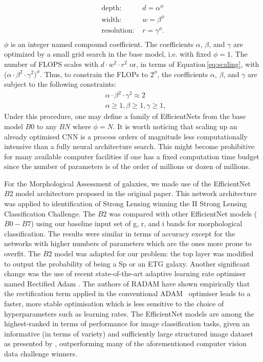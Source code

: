 \documentclass[fleqn,usenatbib]{mnras}
\begin{document}
\begin{equation} \label{eq:scaling} 
\begin{aligned}
\text{depth: } & d  = \alpha ^ \phi \\
\text{width: } & w = \beta ^ \phi \\
\text{resolution: } & r   =  \gamma ^ \phi.  \\
\end{aligned}
\end{equation}
$\phi$ is an integer named compound coefficient.
The coefficients $\alpha$, $\beta$, and $\gamma$ are optimized by a small grid search in the base model, i.e. with fixed $\phi=1$. The number of FLOPS scales with $d \cdot w^2 \cdot r^2$ or, in terms of Equation\,\ref{eq:scaling}, with ($\alpha \cdot \beta ^2 \cdot \gamma ^2)^ \phi$. Thus, to constrain the FLOPs to $2^\phi$, the coefficients $\alpha$, $\beta$, and $\gamma$ are subject to the following constraints:
\begin{equation} \label{eq:optobj} 
\begin{aligned}
& \alpha \cdot \beta ^2 \cdot \gamma ^ 2 \approx 2 \\
& \alpha \ge 1, \beta \ge 1, \gamma \ge 1, 
\end{aligned}
\end{equation}
Under this procedure, one may define a family of EfficientNets from the base model $B0$ to any $BN$ where $\phi=N$. 
It is worth noticing that scaling up an already optimised CNN is a process orders of magnitude less computationally intensive than a fully neural architecture search. This might become prohibitive for many available computer facilities if one has a fixed computation time budget since the number of parameters is of the order of millions or dozen of millions. 

For the Morphological Assessment of galaxies, we made use of the EfficientNet $B2$ model architecture proposed in the original \citet{efficientnet} paper. This network architecture was applied to identification of Strong Lensing \citep{challenge02} winning the II Strong Lensing Classification Challenge. The $B2$ was compared with other EfficientNet models ($B0-B7$) using our baseline input set of g, r, and i bands for morphological classification. The results were similar in terms of accuracy except for the networks with higher numbers of parameters which are the ones more prone to overfit. The $B2$ model was adapted for our problem: the top layer was modified to output the probability of being a Sp or an ETG galaxy. Another significant change was the use of recent state-of-the-art adaptive learning rate optimiser named Rectified Adam \citep[RADAM][]{liu2019variance}. The authors of RADAM have shown empirically that the rectification term applied in the conventional ADAM~\citep{kingma2014adam} optimiser leads to a faster, more stable optimisation which is less sensitive to the choice of hyperparameters such as learning rates. The EfficientNet models are among the highest-ranked in terms of performance for image classification tasks, given an informative (in terms of variety) and sufficiently large structured image dataset as presented by \citet{efficientnet}, outperforming many of the aforementioned computer vision data challenge winners.
\end{document}
